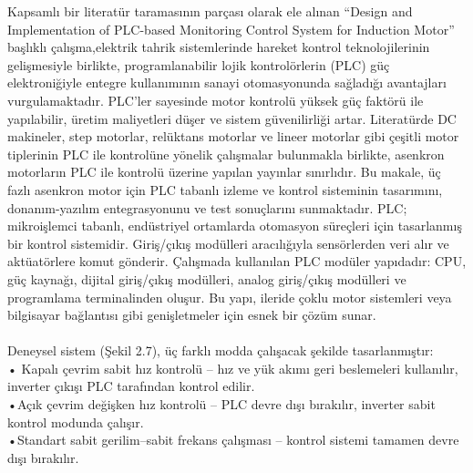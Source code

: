 Kapsamlı bir literatür taramasının parçası olarak ele alınan “Design and Implementation of PLC-based Monitoring Control System for Induction Motor” başlıklı çalışma,elektrik tahrik sistemlerinde hareket kontrol teknolojilerinin gelişmesiyle birlikte, programlanabilir lojik kontrolörlerin (PLC) güç elektroniğiyle entegre kullanımının sanayi otomasyonunda sağladığı avantajları vurgulamaktadır. PLC’ler sayesinde motor kontrolü yüksek güç faktörü ile yapılabilir, üretim maliyetleri düşer ve sistem güvenilirliği artar. Literatürde DC makineler, step motorlar, relüktans motorlar ve lineer motorlar gibi çeşitli motor tiplerinin PLC ile kontrolüne yönelik çalışmalar bulunmakla birlikte, asenkron motorların PLC ile kontrolü üzerine yapılan yayınlar sınırlıdır. Bu makale, üç fazlı asenkron motor için PLC tabanlı izleme ve kontrol sisteminin tasarımını, donanım-yazılım entegrasyonunu ve test sonuçlarını sunmaktadır.
PLC; mikroişlemci tabanlı, endüstriyel ortamlarda otomasyon süreçleri için tasarlanmış bir kontrol sistemidir. Giriş/çıkış modülleri aracılığıyla sensörlerden veri alır ve aktüatörlere komut gönderir. Çalışmada kullanılan PLC modüler yapıdadır: CPU, güç kaynağı, dijital giriş/çıkış modülleri, analog giriş/çıkış modülleri ve programlama terminalinden oluşur. Bu yapı, ileride çoklu motor sistemleri veya bilgisayar bağlantısı gibi genişletmeler için esnek bir çözüm sunar.\\
\\
Deneysel sistem (Şekil 2.7), üç farklı modda çalışacak şekilde tasarlanmıştır:\\
    • Kapalı çevrim sabit hız kontrolü – hız ve yük akımı geri beslemeleri kullanılır, inverter çıkışı PLC tarafından kontrol edilir.\\
    •Açık çevrim değişken hız kontrolü – PLC devre dışı bırakılır, inverter sabit kontrol modunda çalışır.\\
    •Standart sabit gerilim–sabit frekans çalışması – kontrol sistemi tamamen devre dışı bırakılır.\\
